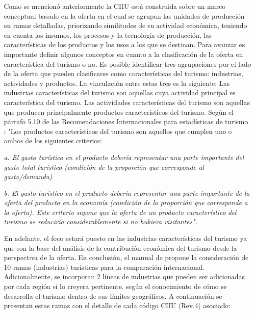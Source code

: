 \documentclass[
  openany]{book}
\begin{document}
Como se mencionó anteriormente la CIIU está construida sobre un marco conceptual basado en la oferta en el cual se agrupan las unidades de producción en ramas detalladas, priorizando similitudes de su actividad económica, teniendo en cuenta los insumos, los procesos y la tecnología de producción, las características de los productos y los usos a los que se destinan. Para avanzar es importante definir algunos conceptos en cuanto a la clasificación de la oferta en característica del turismo o no. Es posible identificar tres agrupaciones por el lado de la oferta que pueden clasificarse como características del turismo: industrias, actividades y productos. La vinculación entre estas tres es la siguiente: Las industrias características del turismo son aquellas cuya actividad principal es característica del turismo. Las actividades características del turismo son aquellas que producen principalmente productos característicos del turismo. Según el párrafo 5.10 de las Recomendaciones Internacionales para estadísticas de turismo \citep{riet2008}: "Los productos característicos del turismo son aquellos que cumplen uno o ambos de los siguientes criterios:

\emph{a. El gasto turístico en el producto debería representar una parte importante del gasto total turístico (condición de la proporción que corresponde al gasto/demanda)}

\emph{b. El gasto turístico en el producto debería representar una parte importante de la oferta del producto en la economía (condición de la proporción que corresponde a la oferta). Este criterio supone que la oferta de un producto característico del turismo se reduciría considerablemente si no hubiera visitantes".}

En adelante, el foco estará puesto en las industrias características del turismo ya que son la base del análisis de la contribución económica del turismo desde la perspectiva de la oferta. En conclusión, el manual de \citet{cstrmc2008} propone la consideración de 10 ramas (industrias) turísticas para la comparación internacional. Adicionalmente, se incorporan 2 líneas de industrias que pueden ser adicionadas por cada región si lo creyera pertinente, según el conocimiento de cómo se desarrolla el turismo dentro de sus límites geográficos. A continuación se presentan estas ramas con el detalle de cada código CIIU (Rev.4) asociado:
\end{document}
